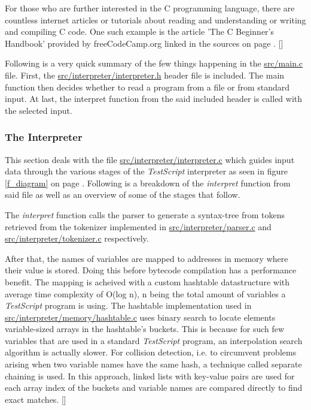 \documentclass[12pt,a4paper]{article}
\newcommand{\hrc}[1]{\hyperref[#1]{#1}}
\newcommand{\name}{\emph{TestScript}}
\begin{document}
For those who are further interested in the C programming language, there are
countless internet articles or tutorials about reading and understanding or
writing and compiling C code. One such example is the article 'The C Beginner's
Handbook' provided by freeCodeCamp.org linked in the sources
on page \pageref{bibliography}.
[]

Following is a very quick summary of the few 
things happening in the \hrc{src/main.c} file.
First, the \hrc{src/interpreter/interpreter.h} header file is included. 
The main function then decides whether to
read a program from a file or from standard input. 
At last, the interpret function
from the said included header is called with the selected input.

\subsubsection{The Interpreter}
This section deals with the file 
\hrc{src/interpreter/interpreter.c} which guides
input data through the various stages of the \name{} interpreter as 
seen in figure \ref{f_diagram} on page \pageref{f_diagram}.
Following is a breakdown of the \emph{interpret} function from said file
as well as an overview of some of the stages that follow.

The \emph{interpret} function calls the parser to generate a syntax-tree from tokens retrieved
from the tokenizer implemented in \hrc{src/interpreter/parser.c} and 
\hrc{src/interpreter/tokenizer.c} respectively.

After that, the names of variables are
mapped to addresses in memory where their value is stored. Doing this before
bytecode compilation has a performance benefit. 
The mapping is acheived with a custom hashtable datastructure with average time
complexity of O(log n), n being the total amount of variables a \name{} program is using.
The hashtable implementation used in \hrc{src/interpreter/memory/hashtable.c}                   %
uses binary search to locate elements variable-sized arrays in the hashtable's buckets.
This is because for such few variables that are used in a standard \name{} program,
an interpolation search algorithm is actually slower.
For collision detection, i.e. to circumvent problems arising when two variable names have the
same hash, a technique called separate chaining is used. In this approach, linked lists with
key-value pairs are used for each array index of the buckets and variable names are compared directly
to find exact matches.
[]
\end{document}
